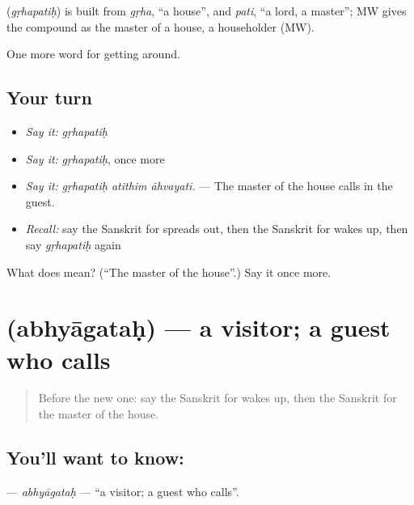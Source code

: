 \begin{cousinweb}
\textbf{} (\emph{gṛhapatiḥ}) is built from \emph{gṛha}, \textquotedblleft{}a house\textquotedblright{}, and \emph{pati}, \textquotedblleft{}a lord, a master\textquotedblright{}; MW gives the compound as the master of a house, a householder (MW).
\end{cousinweb}

\begin{grammarlens}[title={What you've built}]
One more word for getting around.
\end{grammarlens}

\subsection*{Your turn}
\begin{itemize}
\raggedright
  \item \emph{Say it:} \emph{gṛhapatiḥ}
  \item \emph{Say it:} \emph{gṛhapatiḥ}, once more
  \item \emph{Say it:} \emph{gṛhapatiḥ atithim āhvayati.} — The master of the house calls in the guest.
  \item \emph{Recall:} say the Sanskrit for spreads out, then the Sanskrit for wakes up, then say \emph{gṛhapatiḥ} again
\end{itemize}

\begin{tcolorbox}[breakable,colback=teal!4,colframe=teal!35!black,title={Before you move on}]
What does  mean? (\textquotedblleft{}The master of the house\textquotedblright{}.) Say it once more.
\end{tcolorbox}
\section[\texorpdfstring{\sk{अभ्यागतः} (abhyāgataḥ)}{अभ्यागतः (abhyāgataḥ)}]{ (abhyāgataḥ) — a visitor; a guest who calls}

\label{lesson:SA-C428-abhyagatah}



\begin{quote}
Before the new one: say the Sanskrit for wakes up, then the Sanskrit for the master of the house.
\end{quote}

\subsection*{You'll want to know: }
\textbf{} — \emph{abhyāgataḥ} — \textquotedblleft{}a visitor; a guest who calls\textquotedblright{}.

